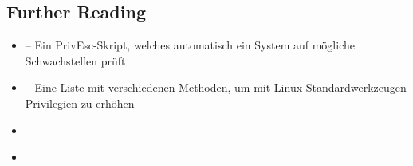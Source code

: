 \documentclass[
    parskip=half,
    landscape
]{scrartcl}
\providecommand{\tightlist}{%
   \setlength{\itemsep}{0pt}\setlength{\parskip}{0pt}}
\let\originalhref\href
\renewcommand\href[2]{\originalhref{#1}{\color{blue}{#2}}}%
\begin{document}
\begin{multicols}{3}
\section{Further Reading}

\begin{itemize}
\tightlist
\item \href{https://github.com/carlospolop/privilege-escalation-awesome-scripts-suite/tree/master/linPEAS}{\texttt{linpeas.sh}} -- Ein PrivEsc-Skript, welches automatisch ein System auf mögliche Schwachstellen prüft
\item
  \href{https://gtfobins.github.io/}{GTFOBins} -- Eine Liste mit
  verschiedenen Methoden, um mit Linux-Standardwerkzeugen Privilegien zu
  erhöhen
\item
  \href{https://github.com/swisskyrepo/PayloadsAllTheThings/blob/master/Methodology\%20and\%20Resources/Linux\%20-\%20Privilege\%20Escalation.md}{PayloadsAllTheThings
  - Linux Privilege Escalation}
\item
  \href{https://book.hacktricks.xyz/linux-unix/linux-privilege-escalation-checklist}{Linux
  Privilege Escalation Checklist}
\end{itemize}

\end{multicols}
\end{document}
